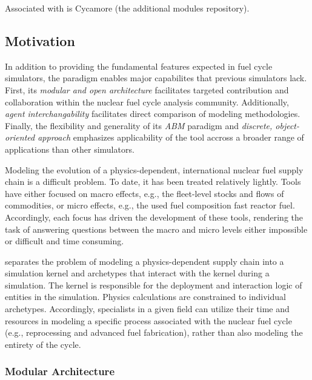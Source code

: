 Associated with \Cyclus is Cycamore (the additional modules repository). 

\subsection{Motivation}

In addition to providing the fundamental features expected in fuel cycle 
simulators, the \Cyclus paradigm enables major capabilites that previous 
simulators lack. First, its \emph{modular and open architecture}  facilitates 
targeted contribution and collaboration within the nuclear fuel cycle analysis 
community.  Additionally, \emph{agent interchangability} facilitates direct 
comparison of modeling methodologies. Finally, the flexibility and generality 
of its \emph{\gls{ABM}} paradigm and \emph{discrete, object-oriented approach} 
emphasizes applicability of the \Cyclus tool accross a broader range of 
applications than other simulators. 

Modeling the evolution of a physics-dependent, international nuclear fuel supply
chain is a difficult problem. To date, it has been treated relatively
lightly. Tools have either focused on macro effects, e.g., the fleet-level
stocks and flows of commodities, or micro effects, e.g., the used fuel
composition fast reactor fuel. Accordingly, each focus has driven the
development of these tools, rendering the task of answering questions between
the macro and micro levels either impossible or difficult and time consuming. 

\Cyclus separates the problem of modeling a
physics-dependent supply chain into a simulation kernel and archetypes that
interact with the kernel during a simulation. The kernel is responsible for the
deployment and interaction logic of entities in the simulation. Physics
calculations are constrained to individual archetypes. Accordingly, specialists
in a given field can utilize their time and resources in modeling a specific
process associated with the nuclear fuel cycle (e.g., reprocessing and advanced
fuel fabrication), rather than also modeling the entirety of the cycle.


\subsubsection{Modular Architecture}

